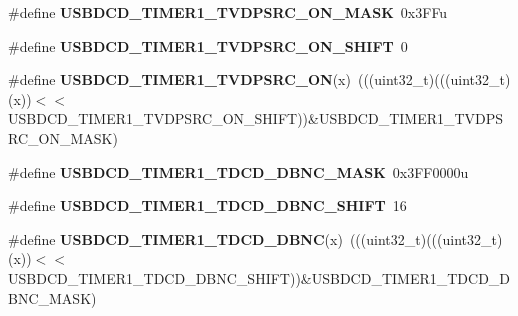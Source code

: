\begin{DoxyCompactItemize}
\item 
\#define {\bfseries U\+S\+B\+D\+C\+D\+\_\+\+T\+I\+M\+E\+R1\+\_\+\+T\+V\+D\+P\+S\+R\+C\+\_\+\+O\+N\+\_\+\+M\+A\+SK}~0x3\+F\+Fu\hypertarget{group__USBDCD__Register__Masks_ga92a3ff207a03a829c52722ee439a6e2a}{}\label{group__USBDCD__Register__Masks_ga92a3ff207a03a829c52722ee439a6e2a}

\item 
\#define {\bfseries U\+S\+B\+D\+C\+D\+\_\+\+T\+I\+M\+E\+R1\+\_\+\+T\+V\+D\+P\+S\+R\+C\+\_\+\+O\+N\+\_\+\+S\+H\+I\+FT}~0\hypertarget{group__USBDCD__Register__Masks_gaf618094ca6122f71185c4152a74ab1e3}{}\label{group__USBDCD__Register__Masks_gaf618094ca6122f71185c4152a74ab1e3}

\item 
\#define {\bfseries U\+S\+B\+D\+C\+D\+\_\+\+T\+I\+M\+E\+R1\+\_\+\+T\+V\+D\+P\+S\+R\+C\+\_\+\+ON}(x)~(((uint32\+\_\+t)(((uint32\+\_\+t)(x))$<$$<$U\+S\+B\+D\+C\+D\+\_\+\+T\+I\+M\+E\+R1\+\_\+\+T\+V\+D\+P\+S\+R\+C\+\_\+\+O\+N\+\_\+\+S\+H\+I\+FT))\&U\+S\+B\+D\+C\+D\+\_\+\+T\+I\+M\+E\+R1\+\_\+\+T\+V\+D\+P\+S\+R\+C\+\_\+\+O\+N\+\_\+\+M\+A\+SK)\hypertarget{group__USBDCD__Register__Masks_ga1a9a39c864450fac6194594af36b0aaf}{}\label{group__USBDCD__Register__Masks_ga1a9a39c864450fac6194594af36b0aaf}

\item 
\#define {\bfseries U\+S\+B\+D\+C\+D\+\_\+\+T\+I\+M\+E\+R1\+\_\+\+T\+D\+C\+D\+\_\+\+D\+B\+N\+C\+\_\+\+M\+A\+SK}~0x3\+F\+F0000u\hypertarget{group__USBDCD__Register__Masks_gaa9effc48a7e8a226b8624dc08d85d704}{}\label{group__USBDCD__Register__Masks_gaa9effc48a7e8a226b8624dc08d85d704}

\item 
\#define {\bfseries U\+S\+B\+D\+C\+D\+\_\+\+T\+I\+M\+E\+R1\+\_\+\+T\+D\+C\+D\+\_\+\+D\+B\+N\+C\+\_\+\+S\+H\+I\+FT}~16\hypertarget{group__USBDCD__Register__Masks_ga5c3ffaffcc961857121e8ecf9692c70c}{}\label{group__USBDCD__Register__Masks_ga5c3ffaffcc961857121e8ecf9692c70c}

\item 
\#define {\bfseries U\+S\+B\+D\+C\+D\+\_\+\+T\+I\+M\+E\+R1\+\_\+\+T\+D\+C\+D\+\_\+\+D\+B\+NC}(x)~(((uint32\+\_\+t)(((uint32\+\_\+t)(x))$<$$<$U\+S\+B\+D\+C\+D\+\_\+\+T\+I\+M\+E\+R1\+\_\+\+T\+D\+C\+D\+\_\+\+D\+B\+N\+C\+\_\+\+S\+H\+I\+FT))\&U\+S\+B\+D\+C\+D\+\_\+\+T\+I\+M\+E\+R1\+\_\+\+T\+D\+C\+D\+\_\+\+D\+B\+N\+C\+\_\+\+M\+A\+SK)\hypertarget{group__USBDCD__Register__Masks_ga1aa87b0c873931aac928ad346f49729d}{}\label{group__USBDCD__Register__Masks_ga1aa87b0c873931aac928ad346f49729d}


\end{DoxyCompactItemize}
